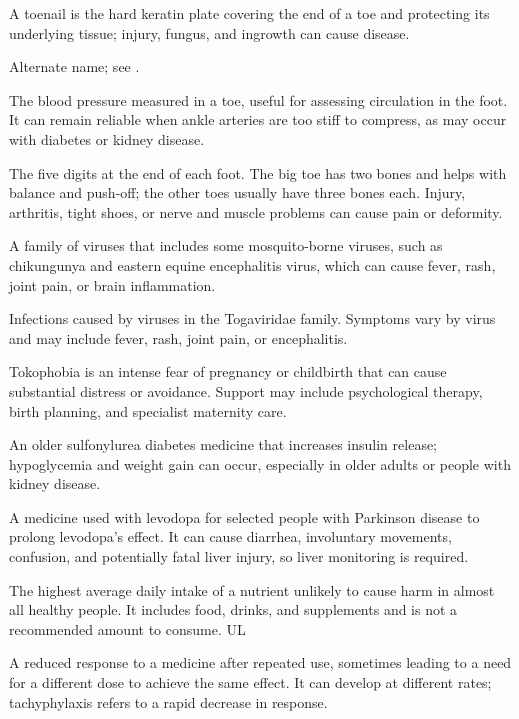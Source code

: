  A toenail is the hard keratin plate covering the end of a toe and protecting its underlying tissue; injury, fungus, and ingrowth can cause disease.

 Alternate name; see .

 The blood pressure measured in a toe, useful for assessing circulation in the foot. It can remain reliable when ankle arteries are too stiff to compress, as may occur with diabetes or kidney disease.

 The five digits at the end of each foot. The big toe has two bones and helps with balance and push-off; the other toes usually have three bones each. Injury, arthritis, tight shoes, or nerve and muscle problems can cause pain or deformity.

 A family of viruses that includes some mosquito-borne viruses, such as chikungunya and eastern equine encephalitis virus, which can cause fever, rash, joint pain, or brain inflammation.

 Infections caused by viruses in the Togaviridae family. Symptoms vary by virus and may include fever, rash, joint pain, or encephalitis.

 Tokophobia is an intense fear of pregnancy or childbirth that can cause substantial distress or avoidance. Support may include psychological therapy, birth planning, and specialist maternity care.

 An older sulfonylurea diabetes medicine that increases insulin release; hypoglycemia and weight gain can occur, especially in older adults or people with kidney disease.

 A medicine used with levodopa for selected people with Parkinson disease to prolong levodopa’s effect. It can cause diarrhea, involuntary movements, confusion, and potentially fatal liver injury, so liver monitoring is required.

 The highest average daily intake of a nutrient unlikely to cause harm in almost all healthy people. It includes food, drinks, and supplements and is not a recommended amount to consume.
\synonyms
UL

 A reduced response to a medicine after repeated use, sometimes leading to a need for a different dose to achieve the same effect. It can develop at different rates; tachyphylaxis refers to a rapid decrease in response.

